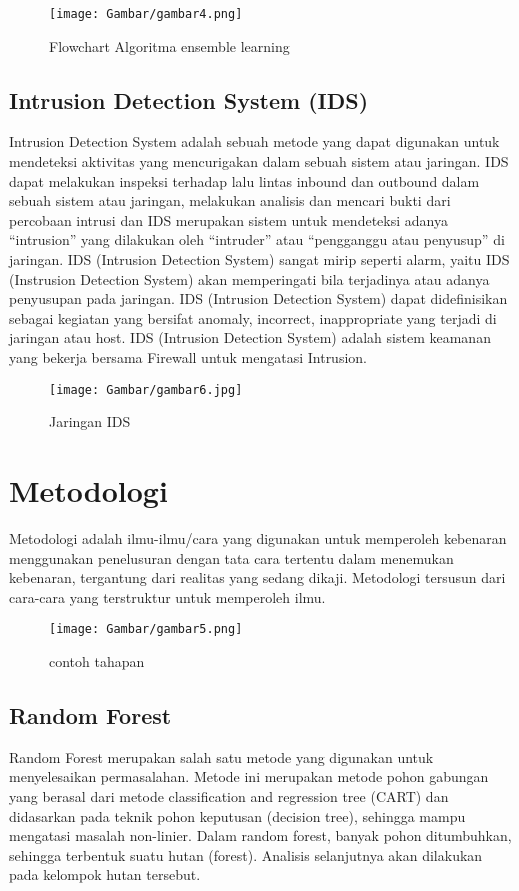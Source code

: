 \documentclass[conference]{IEEEtran}
\begin{document}
\begin{figure}
\centering
\texttt{[image: Gambar/gambar4.png]}
\caption{Flowchart Algoritma ensemble learning}
\end{figure}

\subsection{ Intrusion Detection System (IDS)}\label{IDS}

Intrusion Detection System adalah sebuah metode yang dapat digunakan untuk mendeteksi aktivitas yang mencurigakan dalam sebuah sistem atau jaringan. IDS dapat melakukan inspeksi terhadap lalu lintas inbound dan outbound dalam sebuah sistem atau jaringan, melakukan analisis dan mencari bukti dari percobaan intrusi dan IDS merupakan sistem untuk mendeteksi adanya “intrusion”
yang dilakukan oleh “intruder” atau “pengganggu atau
penyusup” di jaringan. IDS (Intrusion Detection System)
sangat mirip seperti alarm, yaitu IDS (Instrusion Detection System) akan memperingati bila terjadinya atau adanya
penyusupan pada jaringan. IDS (Intrusion Detection System)
dapat didefinisikan sebagai kegiatan yang bersifat anomaly,
incorrect, inappropriate yang terjadi di jaringan atau host. IDS
(Intrusion Detection System) adalah sistem keamanan yang
bekerja bersama Firewall untuk mengatasi Intrusion.


\begin{figure}
\centering
\texttt{[image: Gambar/gambar6.jpg]}
\caption{Jaringan IDS}
\end{figure}

\section{Metodologi}

Metodologi adalah ilmu-ilmu/cara yang digunakan untuk memperoleh kebenaran menggunakan penelusuran dengan tata cara tertentu dalam menemukan kebenaran, tergantung dari realitas yang sedang dikaji. Metodologi tersusun dari cara-cara yang terstruktur untuk memperoleh ilmu.

\begin{figure}
\centering
\texttt{[image: Gambar/gambar5.png]}
\caption{contoh tahapan}
\end{figure}

\subsection{Random Forest}
Random Forest merupakan salah satu metode yang digunakan untuk menyelesaikan permasalahan. Metode ini merupakan metode pohon gabungan yang berasal dari metode
classification and regression tree (CART) dan didasarkan pada
teknik pohon keputusan (decision tree), sehingga mampu mengatasi masalah non-linier. Dalam random forest, banyak pohon
ditumbuhkan, sehingga terbentuk suatu hutan (forest). Analisis
selanjutnya akan dilakukan pada kelompok hutan tersebut.
\end{document}
